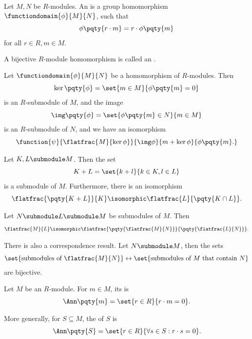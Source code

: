 \begin{definition}
    \label{def:homomorphism-isomorphism-module}%
    Let \(M, N\) be \(R\)-modules. An  is a group homomorphism \(\functiondomain{\phi}{M}{N}\), such that
    \[
        \phi \pqty{r \cdot m} = r \cdot \phi\pqty{m}
    \]
    for all \(r \in R, m \in M\).

    A bijective \(R\)-module homomorphism is called an .
\end{definition}

\begin{theorem}
    \label{thm:first-isomorphism-theorem-modules}%
    Let \(\functiondomain{\phi}{M}{N}\) be a homomorphism of \(R\)-modules. Then
    \[
        \ker\pqty{\phi} = \set{m \in M}{\phi\pqty{m} = 0}
    \]
    is an \(R\)-submodule of \(M\), and the image
    \[
        \img\pqty{\phi} = \set{\phi\pqty{m} \in N}{m \in M}
    \]
    is an \(R\)-submodule of \(N\), and we have an isomorphism
    \[
        \function{\psi}{\flatfrac{M}{\ker \phi}}{\img \phi}{m + \ker \phi}{\phi\pqty{m}.}
    \]
\end{theorem}

\begin{theorem}
    \label{thm:second-isomorphism-theorem-modules}%
    Let \(K, L \submodule M\). Then the set
    \[
        K + L = \set{k + l}{k \in K, l \in L}
    \]
    is a submodule of \(M\). Furthermore, there is an isomorphism
    \[
        \flatfrac{\pqty{K + L}}{K} \isomorphic \flatfrac{L}{\pqty{K \cap L}}.
    \]
\end{theorem}

\begin{theorem}
    \label{thm:third-isomorphism-theorem-modules}%
    Let \(N \submodule L \submodule M\) be submodules of \(M\). Then
    \[
        \flatfrac{M}{L} \isomorphic \flatfrac{\pqty{\flatfrac{M}{N}}}{\pqty{\flatfrac{L}{N}}}.
    \]
\end{theorem}

There is also a correspondence result. Let \(N \submodule M\), then the sets
\[
    \set{\text{submodules of }\flatfrac{M}{N}} \leftrightarrow \set{\text{submodules of }M\text{ that contain }N}
\]
are bijective.

\begin{definition}[Annihilator]
    \label{def:annihiliator}%
    Let \(M\) be an \(R\)-module. For \(m \in M\), its  is
    \[
        \Ann\pqty{m} = \set{r \in R}{r \cdot m = 0}.
    \]

    More generally, for \(S \subseteq M\), the  of \(S\) is
    \[
        \Ann\pqty{S} = \set{r \in R}{\forall s \in S: r \cdot s = 0}.
    \]
\end{definition}


